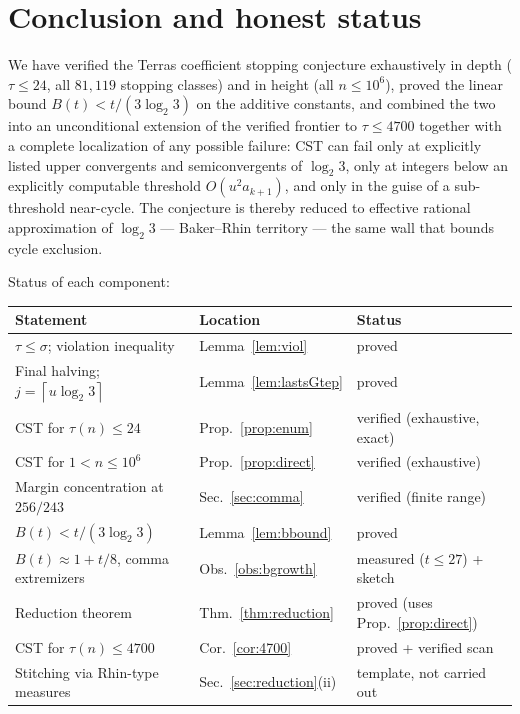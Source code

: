\documentclass[10pt]{article}
\theoremstyle{definition}
\theoremstyle{remark}
\newcommand{\ceil}[1]{\left\lceil #1 \right\rceil}
\newcommand{\lb}{\log_2 3}
\begin{document}
\section{Conclusion and honest status}\label{sec:conclusion}

We have verified the Terras coefficient stopping conjecture exhaustively in
depth ($\tau \le 24$, all $81{,}119$ stopping classes) and in height (all
$n \le 10^{6}$), proved the linear bound $B(t) < t/(3\lb)$ on the additive
constants, and combined the two into an unconditional extension of the
verified frontier to $\tau \le 4700$ together with a complete localization of
any possible failure: CST can fail only at explicitly listed upper
convergents and semiconvergents of $\lb$, only at integers below an
explicitly computable threshold $O(u^{2} a_{k+1})$, and only in the guise of
a sub-threshold near-cycle. The conjecture is thereby reduced to effective
rational approximation of $\lb$ --- Baker--Rhin territory --- the same wall
that bounds cycle exclusion.

Status of each component:

\begin{center}
\begin{tabular}{lll}
\hline
Statement & Location & Status \\
\hline
$\tau \le \sigma$; violation inequality & Lemma~\ref{lem:viol} & proved \\
Final halving; $j = \ceil{u\lb}$ & Lemma~\ref{lem:lastsGtep} & proved \\
CST for $\tau(n) \le 24$ & Prop.~\ref{prop:enum} &
 verified (exhaustive, exact) \\
CST for $1 < n \le 10^{6}$ & Prop.~\ref{prop:direct} &
 verified (exhaustive) \\
Margin concentration at $256/243$ & Sec.~\ref{sec:comma} &
 verified (finite range) \\
$B(t) < t/(3\lb)$ & Lemma~\ref{lem:bbound} & proved \\
$B(t) \approx 1 + t/8$, comma extremizers & Obs.~\ref{obs:bgrowth} &
 measured ($t \le 27$) + sketch \\
Reduction theorem & Thm.~\ref{thm:reduction} & proved (uses
 Prop.~\ref{prop:direct}) \\
CST for $\tau(n) \le 4700$ & Cor.~\ref{cor:4700} &
 proved + verified scan \\
Stitching via Rhin-type measures & Sec.~\ref{sec:reduction}(ii) &
 template, not carried out \\
\hline
\end{tabular}
\end{center}
\end{document}
